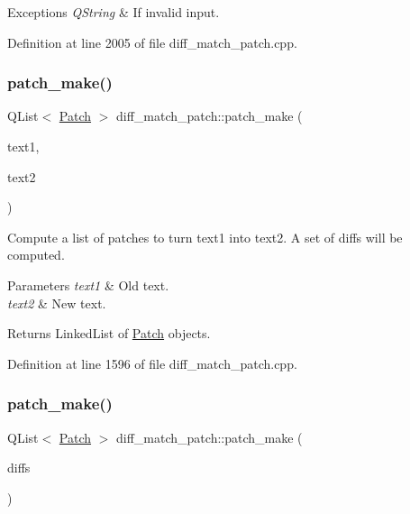\begin{DoxyExceptions}{Exceptions}
{\em Q\+String} & If invalid input. \\
\hline
\end{DoxyExceptions}


Definition at line 2005 of file diff\+\_\+match\+\_\+patch.\+cpp.

\mbox{\label{classdiff__match__patch_afb9335ec40ffb7b74a822a1210d90e19}} 
\subsubsection{\texorpdfstring{patch\+\_\+make()}{patch\_make()}\hspace{0.1cm}{\footnotesize\ttfamily [1/4]}}
{\footnotesize\ttfamily Q\+List$<$ \hyperlink{class_patch}{Patch} $>$ diff\+\_\+match\+\_\+patch\+::patch\+\_\+make (\begin{DoxyParamCaption}\item[{const Q\+String \&}]{text1,  }\item[{const Q\+String \&}]{text2 }\end{DoxyParamCaption})}

Compute a list of patches to turn text1 into text2. A set of diffs will be computed. 
\begin{DoxyParams}{Parameters}
{\em text1} & Old text. \\
\hline
{\em text2} & New text. \\
\hline
\end{DoxyParams}
\begin{DoxyReturn}{Returns}
Linked\+List of \hyperlink{class_patch}{Patch} objects. 
\end{DoxyReturn}


Definition at line 1596 of file diff\+\_\+match\+\_\+patch.\+cpp.

\mbox{\label{classdiff__match__patch_ac5992f58192fc44530f33dd40202c165}} 
\subsubsection{\texorpdfstring{patch\+\_\+make()}{patch\_make()}\hspace{0.1cm}{\footnotesize\ttfamily [2/4]}}
{\footnotesize\ttfamily Q\+List$<$ \hyperlink{class_patch}{Patch} $>$ diff\+\_\+match\+\_\+patch\+::patch\+\_\+make (\begin{DoxyParamCaption}\item[{const Q\+List$<$ \hyperlink{class_diff}{Diff} $>$ \&}]{diffs }\end{DoxyParamCaption})}


